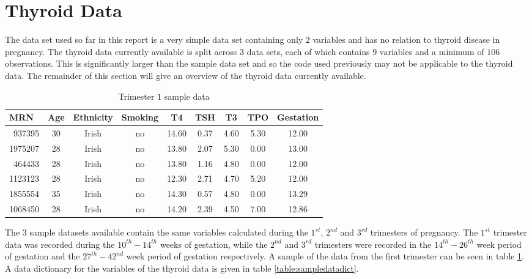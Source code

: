 \documentclass[12pt,a4paper]{report}
\begin{document}
\section{Thyroid Data}
The data set used so far in this report is a very simple data set containing only $2$ variables and has no relation to thyroid disease in pregnancy. The thyroid data currently available is split across $3$ data sets, each of which contains $9$ variables and a minimum of $106$ observations. This is significantly larger than the sample data set and so the code used previously may not be applicable to the thyroid data. The remainder of this section will give an overview of the thyroid data currently available.
\vspace{2mm}

\begin{table}[ht]
\begin{center}
\begin{tabular}{|l||c|c|c|c|c|c|c|c|}\hline \multicolumn{1}{|l||}{MRN}&\multicolumn{1}{c|}{Age}&\multicolumn{1}{c|}{Ethnicity}&\multicolumn{1}{c|}{Smoking}&\multicolumn{1}{c|}{T4}&\multicolumn{1}{c|}{TSH}&\multicolumn{1}{c|}{T3}&\multicolumn{1}{c|}{TPO}&\multicolumn{1}{c|}{Gestation}\tabularnewline
\hline
~937395 & 30 & Irish & no & 14.60 & 0.37 & 4.60 & 5.30 & 12.00 \tabularnewline
1975207 & 28 & Irish & no & 13.80 & 2.07 & 5.30 & 0.00 & 13.00 \tabularnewline
~464433 & 28 & Irish & no & 13.80 & 1.16 & 4.80 & 0.00 & 12.00 \tabularnewline
1123123 & 28 & Irish & no & 12.30 & 2.71 & 4.70 & 5.20 & 12.00 \tabularnewline
1855554 & 35 & Irish & no & 14.30 & 0.57 & 4.80 & 0.00 & 13.29 \tabularnewline
1068450 & 28 & Irish & no & 14.20 & 2.39 & 4.50 & 7.00 & 12.86 \tabularnewline
\hline
\end{tabular}
\end{center}
\caption{Trimester $1$ sample data}
\label{table:sampledata}
\end{table}

The $3$ sample datasets available contain the same variables calculated during the $1^{st}$, $2^{nd}$ and $3^{rd}$ trimesters of pregnancy. The $1^{st}$ trimester data was recorded during the $10^{th}-14^{th}$ weeks of gestation, while the $2^{nd}$ and $3^{rd}$ trimesters were recorded in the $14^{th}-26^{th}$ week period of gestation and the $27^{th}-42^{nd}$ week period of gestation respectively.  A sample of the data from the first trimester can be seen in table \ref{table:sampledata}. A data dictionary for the variables of the thyroid data is given in table \ref{table:sampledatadict}.
\vspace{2mm}
\end{document}
